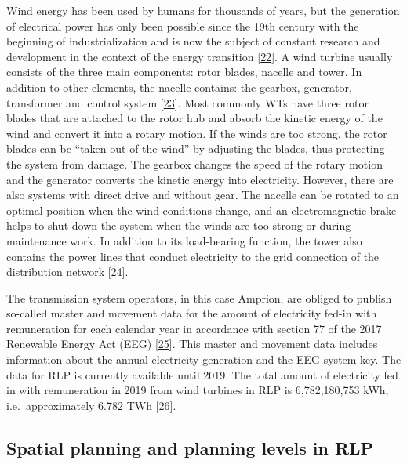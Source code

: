 \documentclass[a4paper,11pt]{article}
\begin{document}
Wind energy has been used by humans for thousands of years, but the generation of electrical power has only been possible since the 19th century with the beginning of industrialization and is now the subject of constant research and development in the context of the energy transition {[}\protect\hyperlink{ref-Wikipedia.2021}{22}{]}. A wind turbine usually consists of the three main components: rotor blades, nacelle and tower. In addition to other elements, the nacelle contains: the gearbox, generator, transformer and control system {[}\protect\hyperlink{ref-MladenBosnjakovic.2013}{23}{]}. Most commonly WTs have three rotor blades that are attached to the rotor hub and absorb the kinetic energy of the wind and convert it into a rotary motion. If the winds are too strong, the rotor blades can be ``taken out of the wind'' by adjusting the blades, thus protecting the system from damage. The gearbox changes the speed of the rotary motion and the generator converts the kinetic energy into electricity. However, there are also systems with direct drive and without gear. The nacelle can be rotated to an optimal position when the wind conditions change, and an electromagnetic brake helps to shut down the system when the winds are too strong or during maintenance work. In addition to its load-bearing function, the tower also contains the power lines that conduct electricity to the grid connection of the distribution network {[}\protect\hyperlink{ref-NetzKonstrukteur.16.11.2020}{24}{]}.

The transmission system operators, in this case Amprion, are obliged to publish so-called master and movement data for the amount of electricity fed-in with remuneration for each calendar year in accordance with section 77 of the 2017 Renewable Energy Act (EEG) {[}\protect\hyperlink{ref-Bundesgestzblatt.2017}{25}{]}. This master and movement data includes information about the annual electricity generation and the EEG system key. The data for RLP is currently available until 2019. The total amount of electricity fed in with remuneration in 2019 from wind turbines in RLP is 6,782,180,753 kWh, i.e.~approximately 6.782 TWh {[}\protect\hyperlink{ref-EnergieagenturRheinlandPfalz.2019}{26}{]}.

\hypertarget{spatial-planning-and-planning-levels-in-rlp}{%
\subsection{Spatial planning and planning levels in RLP}\label{spatial-planning-and-planning-levels-in-rlp}}
\end{document}
